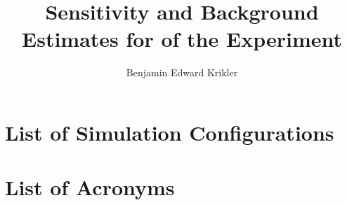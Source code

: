 \documentclass{thesis}
\title{Sensitivity and Background Estimates for \phaseII of the \COMET Experiment}
\author{Benjamin Edward Krikler}
\begin{document}


\begin{frontmatter}
  
\end{frontmatter}

\begin{mainmatter}





%
%
%





\end{mainmatter}

\begin{appendices}




\end{appendices}

\begin{backmatter}
\chapter{List of Simulation Configurations}
\chapter{List of Acronyms}

\end{backmatter}


%

\end{document}

